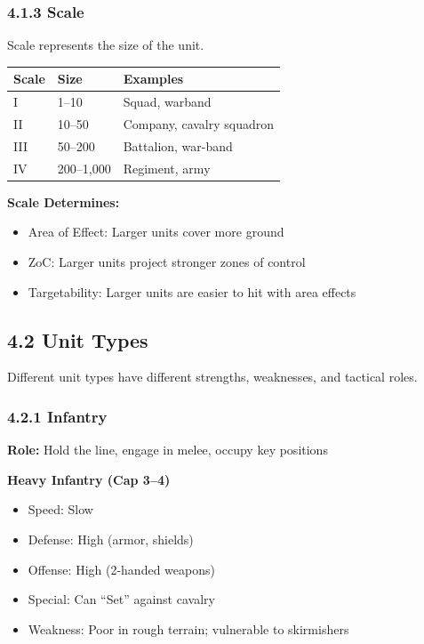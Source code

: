 \documentclass[11pt]{article}
\begin{document}
\subsubsection{4.1.3 Scale}

Scale represents the size of the unit.

\begin{tabular}{|l|l|l|}
\hline
Scale & Size & Examples \\
\hline
I & 1–10 & Squad, warband \\
\hline
II & 10–50 & Company, cavalry squadron \\
\hline
III & 50–200 & Battalion, war-band \\
\hline
IV & 200–1,000 & Regiment, army \\
\hline
\end{tabular}

\textbf{Scale Determines:}
\begin{itemize}
  \item Area of Effect: Larger units cover more ground
  \item ZoC: Larger units project stronger zones of control
  \item Targetability: Larger units are easier to hit with area effects
\end{itemize}

\subsection{4.2 Unit Types}

Different unit types have different strengths, weaknesses, and tactical roles.

\subsubsection{4.2.1 Infantry}

\textbf{Role:} Hold the line, engage in melee, occupy key positions

\textbf{Heavy Infantry (Cap 3–4)}\\
\begin{itemize}
  \item Speed: Slow
  \item Defense: High (armor, shields)
  \item Offense: High (2-handed weapons)
  \item Special: Can ``Set'' against cavalry
  \item Weakness: Poor in rough terrain; vulnerable to skirmishers
\end{itemize}
\end{document}
